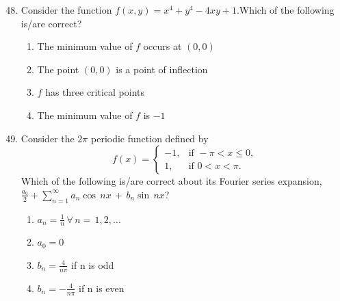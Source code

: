 \documentclass[journal]{IEEEtran}
\theoremstyle{remark}
\begin{document}
\begin{enumerate}[itemsep=1em]
\setcounter{enumi}{47}
\item Consider the function $f(x,y)=x^4+y^4-4xy+1$.Which of the following is/are correct? 
\begin{enumerate}[ leftmargin=2.5em, labelsep=0.5em, itemsep=0.5em]
    \item The minimum value of $f$ occurs at $(0,0)$  
    \item The point $(0,0)$ is a point of inflection 
    \item $f$ has three critical points 
    \item The minimum value of $f$ is $-1$
\end{enumerate}
\end{enumerate}

\newpage
\vspace*{0.25cm}

\begin{enumerate}[itemsep=1em]
\setcounter{enumi}{48}
\item Consider the $2\pi$ periodic function defined by
\[
f(x) =
\begin{cases}
-1, & \text{if } -\pi < x \le 0, \\
1, & \text{if } 0 < x < \pi.
\end{cases}
\]
Which of the following is/are correct about its Fourier series expansion, $\frac{a_0}{2}+\sum_{n=1}^{\infty}a_n\cos\,nx\,+\,b_n\sin\,nx$?

\begin{enumerate}[leftmargin=2.5em, labelsep=0.5em, itemsep=0.5em]
      \item $a_n=\frac{1}{n}\,\forall\,n=\,1,2,...$
      \item $a_0=0$
      \item $b_n=\frac{4}{n\pi}$ if n is odd
      \item $b_n=-\frac{4}{n\pi}$ if n is even
\end{enumerate}
\end{enumerate}
\end{document}
